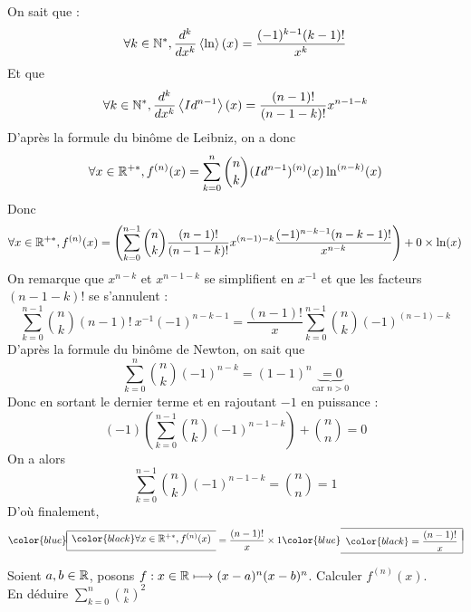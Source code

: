 \documentclass[mathmodern,openany,11pt]{livre}
\newcommand{\lboxed}[1]{{\color{blue}\begin{array}{|l}\hline\\[-2.4ex]{\color{black}#1}\\[1.2ex]\hline\end{array}}}
\newcommand{\rboxed}[1]{{\color{blue}\begin{array}{r|}\hline\\[-2.4ex]{\color{black}#1}\\[1.2ex]\hline\end{array}}}
\begin{document}
\begin{solution}
On sait que :
\[
\forall k \in \mathbb{N}^*, \dfrac{d^k}{dx^k}\left\langle\ln\right\rangle(x) = \dfrac{(-1)^{k-1}(k-1)!}{x^k}
\]
Et que 
\[
\forall k \in \mathbb{N}^*, \dfrac{d^k}{dx^k}\left\langle Id^{n-1} \right\rangle(x) = \dfrac{(n-1)!}{(n-1-k)!} x^{n-1-k}
\]
D'après la formule du binôme de Leibniz, on a donc
\[
\forall x \in \mathbb{R}^{+*}, 
f^{(n)}(x)
= \displaystyle\sum\limits_{k=0}^{n} \binom{n}{k} (Id^{n-1})^{(n)}(x) \ln^{(n-k)}(x)
\]
Donc 
\[
\forall x \in \mathbb{R}^{+*}, 
f^{(n)}(x)
= \left(\displaystyle\sum\limits_{k=0}^{n-1} \binom{n}{k} \dfrac{(n-1)!}{(n-1-k)!} x^{(n-1)-k} \dfrac{(-1)^{n-k-1}(n-k-1)!}{x^{n-k}}\right) + 0 \times \ln(x)
\]
On remarque que $x^{n-k}$ et $x^{n-1-k}$ se simplifient en $x^{-1}$ et que les facteurs $(n-1-k)!$ se s'annulent :
\[
\displaystyle\sum\limits_{k=0}^{n-1} \binom{n}{k} (n-1)! \: x^{-1} (-1)^{n-k-1}
= \dfrac{(n-1)!}{x} \displaystyle\sum\limits_{k=0}^{n-1} \binom{n}{k} (-1)^{(n-1)-k}
\]
D'après la formule du binôme de Newton, on sait que 
\[
\displaystyle\sum\limits_{k=0}^{n} \binom{n}{k} (-1)^{n-k} = (1-1)^n \underbrace{= 0}_{\text{car $n > 0$}}
\]
Donc en sortant le dernier terme et en rajoutant $-1$ en puissance :
\[
(-1)\left(\displaystyle\sum\limits_{k=0}^{n-1} \binom{n}{k} (-1)^{n-1-k}\right) + \binom{n}{n} = 0
\]
On a alors 
\[
\displaystyle\sum\limits_{k=0}^{n-1} \binom{n}{k} (-1)^{n-1-k} = \binom{n}{n} = 1
\]
D'où finalement, 
\[
\lboxed{\forall x \in \setRealNumbers^{+*}, 
f^{(n)}(x)}
= \dfrac{(n-1)!}{x} \times 1 
\rboxed{= \dfrac{(n-1)!}{x}}
\] 
\end{solution}

\begin{exercice}
Soient $a,b\in\mathbb{R}$, posons $\function[f]{x\in\setRealNumbers}{(x-a)^n (x-b)^n}$. Calculer $f^{(n)}(x)$.\\
En déduire $\displaystyle\sum\limits_{k=0}^{n} \binom{n}{k}^2$
\end{exercice}
\end{document}
